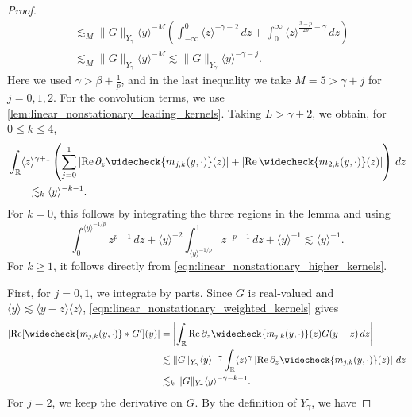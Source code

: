 \documentclass[11pt]{amsart}
\theoremstyle{definition}
\theoremstyle{remark}
\numberwithin{equation}{section}
\newcommand{\R}{\mathbb{R}}
\newcommand{\ang}[1]{\langle #1 \rangle}
\begin{document}
\begin{proof}
\begin{align*}
        & \lesssim_M \|G\|_{Y_\gamma}\ang{y}^{-M}\left(\int_{-\infty}^{0}\ang{z}^{-\gamma-2}\,dz+\int_{0}^{\infty}\ang{z}^{\frac{3-p}{2p}-\gamma}\,dz\right)\\
        & \lesssim_M \|G\|_{Y_\gamma}\ang{y}^{-M}\lesssim \|G\|_{Y_\gamma}\ang{y}^{-\gamma-j}.
    \end{align*}
    Here we used $\gamma>\beta+\frac1p$, and in the last inequality we take $M=5>\gamma+j$ for $j=0,1,2$. For the convolution terms, we use \cref{lem:linear_nonstationary_leading_kernels}. Taking $L>\gamma+2$, we obtain, for $0\leq k\leq4$,
    \begin{equation}\label{eqn:linear_nonstationary_weighted_kernels}
        \begin{aligned}
            &\int_{\R}\ang{z}^{\gamma+1}\left(\sum_{j=0}^1\left|\operatorname{Re}\partial_z\widecheck{m_{j,k}(y,\cdot)}(z)\right|
            +\left|\operatorname{Re}\widecheck{m_{2,k}(y,\cdot)}(z)\right|\right)\,dz\\
            &\qquad\lesssim_k\ang{y}^{-k-1}.
        \end{aligned}
    \end{equation}
    For $k=0$, this follows by integrating the three regions in the lemma and using
    \[
        \int_0^{\ang{y}^{-1/p}}z^{p-1}\,dz
        +\ang{y}^{-2}\int_{\ang{y}^{-1/p}}^1z^{-p-1}\,dz+\ang{y}^{-1}
        \lesssim\ang{y}^{-1}.
    \]
    For $k\geq1$, it follows directly from \eqref{eqn:linear_nonstationary_higher_kernels}. \par
    First, for $j=0,1$, we integrate by parts. Since $G$ is real-valued and $\ang{y}\lesssim\ang{y-z}\ang{z}$, \eqref{eqn:linear_nonstationary_weighted_kernels} gives
    \begin{equation}\label{eqn:linear_nonstationary_convolution_j01}
        \begin{aligned}
            \left|\operatorname{Re}[\widecheck{m_{j,k}(y,\cdot)}*G'](y)\right|
            &=\left|\int_{\R}\operatorname{Re}\partial_z\widecheck{m_{j,k}(y,\cdot)}(z)G(y-z)\,dz\right|\\
            &\lesssim\|G\|_{Y_\gamma}\ang{y}^{-\gamma}
            \int_{\R}\ang{z}^{\gamma}\left|\operatorname{Re}\partial_z\widecheck{m_{j,k}(y,\cdot)}(z)\right|\,dz\\
            &\lesssim_k\|G\|_{Y_\gamma}\ang{y}^{-\gamma-k-1}.
        \end{aligned}
    \end{equation}
    For $j=2$, we keep the derivative on $G$. By the definition of $Y_\gamma$, we have

\end{proof}
\end{document}
